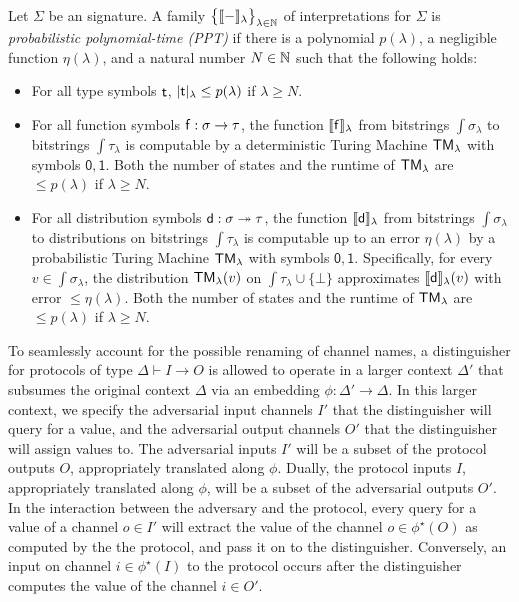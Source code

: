 \begin{definition}\label{def:ppt-interpretation}
Let $\Sigma$ be an \ipdl signature. A family $\big\{\llbracket - \rrbracket_\lambda\big\}_{\lambda \in \mathbb{N}}$ of interpretations for $\Sigma$ is \emph{probabilistic polynomial-time (PPT)} if there is a polynomial $p(\lambda)$, a negligible function $\eta(\lambda)$, and a natural number $N \in \mathbb{N}$ such that the following holds:
\begin{itemize}
\item For all type symbols $\mathsf{t}$, $|\mathsf{t}|_\lambda \leq p(\lambda)$ if $\lambda \geq N$.

\item For all function symbols $\mathsf{f} : \sigma \to \tau$, the function $\llbracket \mathsf{f} \rrbracket_\lambda$ from bitstrings $\int{\sigma}_\lambda$ to bitstrings $\int{\tau}_\lambda$ is computable by a deterministic Turing Machine $\mathsf{TM}_\lambda$ with symbols $\mathsf{0}, \mathsf{1}$. Both the number of states and the runtime of $\mathsf{TM}_\lambda$ are $\leq p(\lambda)$ if $\lambda \geq N$.

\item For all distribution symbols $\mathsf{d} : \sigma \twoheadrightarrow \tau$, the function $\llbracket \mathsf{d} \rrbracket_\lambda$ from bitstrings $\int{\sigma}_\lambda$ to distributions on bitstrings $\int{\tau}_\lambda$ is computable up to an error $\eta(\lambda)$ by a probabilistic Turing Machine $\mathsf{TM}_\lambda$ with symbols $\mathsf{0}, \mathsf{1}$. Specifically, for every $v \in \int{\sigma}_\lambda$, the distribution $\mathsf{TM}_\lambda(v)$ on $\int{\tau}_\lambda \cup \{\bot\}$ approximates $\llbracket \mathsf{d} \rrbracket_\lambda(v)$ with error $\leq \eta(\lambda)$. Both the number of states and the runtime of $\mathsf{TM}_\lambda$ are $\leq p(\lambda)$ if $\lambda \geq N$.
\end{itemize}
\end{definition}

To seamlessly account for the possible renaming of channel names, a distinguisher for protocols of type $\Delta \vdash I \to O$ is allowed to operate in a larger context $\Delta'$ that subsumes the original context $\Delta$ via an embedding $\phi : \Delta'\to \Delta$. In this larger context, we specify the adversarial input channels $I'$ that the distinguisher will query for a value, and the adversarial output channels $O'$ that the distinguisher will assign values to. The adversarial inputs $I'$ will be a subset of the protocol outputs $O$, appropriately translated along $\phi$. Dually, the protocol inputs $I$, appropriately translated along $\phi$, will be a subset of the adversarial outputs $O'$. In the interaction between the adversary and the protocol, every query for a value of a channel $o \in I'$ will extract the value of the channel $o \in \phi^\star(O)$ as computed by the the protocol, and pass it on to the distinguisher. Conversely, an input on channel $i \in \phi^\star(I)$ to the protocol occurs after the distinguisher computes the value of the channel $i \in O'$.

